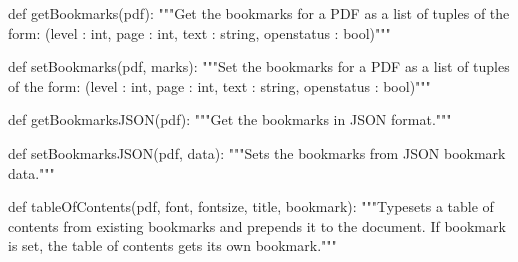 def getBookmarks(pdf):
    """Get the bookmarks for a PDF as a list of tuples of the form:
    (level : int, page : int, text : string, openstatus : bool)"""

def setBookmarks(pdf, marks):
    """Set the bookmarks for a PDF as a list of tuples of the form:
    (level : int, page : int, text : string, openstatus : bool)"""

def getBookmarksJSON(pdf):
    """Get the bookmarks in JSON format."""

def setBookmarksJSON(pdf, data):
    """Sets the bookmarks from JSON bookmark data."""

def tableOfContents(pdf, font, fontsize, title, bookmark):
    """Typesets a table of contents from existing bookmarks and prepends it to
    the document. If bookmark is set, the table of contents gets its own
    bookmark."""
